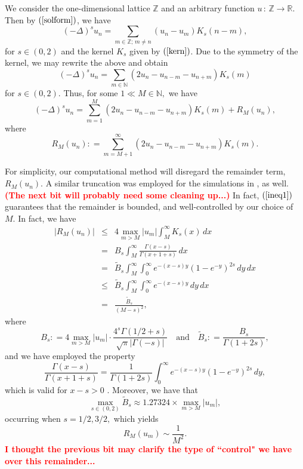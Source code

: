 \documentclass[final,1p,times]{elsarticle}
\def\NN{\mathbb N} %
\def\ZZ{\mathbb Z} %
\def\RR{\mathbb R} %
\newcommand{\bb}[1]{\begin{equation}\label{#1}}
\newcommand{\ee}{\end{equation}}
\newcommand{\bbbb}{\begin{eqnarray*}}
\newcommand{\eeee}{\end{eqnarray*}}
\def\R#1{$(\ref{#1})$}
\theoremstyle{remark}
\theoremstyle{definition}
\newcommand{\josh}[1]{\textcolor{red}{\textbf{#1}}}
\begin{document}
We consider the one-dimensional lattice $\ZZ$ and an arbitrary function $u\,:\,\ZZ\to \RR.$ Then by \R{solform}, we have
$$(-\Delta)^s u_n = \sum_{m\in\ZZ;\,m\neq n} (u_n-u_m)K_s(n-m),$$
for $s\in(0,2)$ and the kernel $K_s$ given by \R{kern}. Due to the symmetry of the kernel, we may rewrite the above and obtain
\bb{comp1}
(-\Delta)^s u_n = \sum_{m\in\NN} (2u_n-u_{n-m}-u_{n+m})K_s(m)
\ee
for $s\in(0,2).$ 
Thus, for some $1 \ll M\in\NN,$ we have
\bb{comp2}
(-\Delta)^s u_n = \sum_{m=1}^M (2u_n-u_{n-m}-u_{n+m})K_s(m) + R_M(u_n),
\ee
where
\bb{comp3}
R_M(u_n) \mathrel{\mathop:}= \sum_{m=M+1}^\infty (2u_n-u_{n-m}-u_{n+m})K_s(m).
\ee



For simplicity, our computational method will disregard the remainder term, $R_M(u_n).$ A similar truncation was employed for the simulations in \cite{ciaurri2015fractional,ciaurri2016nonlocal}, as well. 
\josh{(The next bit will probably need some cleaning up...)}
In fact, \R{ineq1} guarantees that the remainder is bounded, and well-controlled by our choice of $M.$ In fact, we have
\bbbb
|R_M(u_n)| & \le & 4\max_{m>M}|u_m|\int_M^\infty K_s(x)\,dx\\
& = & B_s \int_M^\infty \frac{\Gamma(x-s)}{\Gamma(x+1+s)}\,dx\\
& = & \tilde{B}_s \int_M^\infty \int_0^\infty e^{-(x-s)y}(1-e^{-y})^{2s}\,dy\,dx\\
& \le & \tilde{B}_s\int_M^\infty\int_0^\infty e^{-(x-s)y}\,dy\,dx\\
& = & \frac{\tilde{B}_s}{(M-s)^2},
\eeee
where 
$$B_s \mathrel{\mathop:}= 4\max_{m>M}|u_m|\cdot\frac{4^s\Gamma(1/2+s)}{\sqrt{\pi}|\Gamma(-s)|} \quad \mbox{and}\quad \tilde{B}_s\mathrel{\mathop:}= \frac{B_s}{\Gamma(1+2s)},$$ 
and we have employed the property
\bb{gammaprop}
\frac{\Gamma(x-s)}{\Gamma(x+1+s)} = \frac{1}{\Gamma(1+2s)}\int_0^\infty e^{-(x-s)y}(1-e^{-y})^{2s}\,dy,
\ee
which is valid for $x-s>0$ \cite{LAFORGIA2012833}. Moreover, we have that
$$\max_{s\in(0,2)} \tilde{B}_s \approx 1.27324\times\max_{m>M}|u_m|,$$
occurring when $s = 1/2,3/2,$ which yields
\bb{r_m}
R_M(u_m) \sim \frac{1}{M^2}.
\ee
\josh{I thought the previous bit may clarify the type of ``control" we have over this remainder...}
\end{document}
